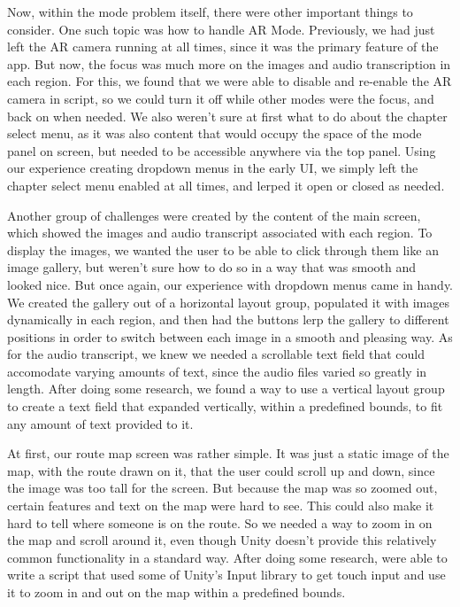 \documentclass[a4paper, 10pt, american, titlepage]{article}
\begin{document}
Now, within the mode problem itself, there were other important things to 
consider. One such topic was how to handle AR Mode. Previously, we had just
left the AR camera running at all times, since it was the primary feature of 
the app. But now, the focus was much more on the images and audio transcription
in each region. For this, we found that we were able to disable and re-enable
the AR camera in script, so we could turn it off while other modes were the
focus, and back on when needed. We also weren't sure at first what to do about
the chapter select menu, as it was also content that would occupy the space of
the mode panel on screen, but needed to be accessible anywhere via the top 
panel. Using our experience creating dropdown menus in the early UI, we simply
left the chapter select menu enabled at all times, and lerped it open or closed
as needed. 

Another group of challenges were created by the content of the main screen,
which showed the images and audio transcript associated with each region. To 
display the images, we wanted the user to be able to click through them like
an image gallery, but weren't sure how to do so in a way that was smooth and
looked nice. But once again, our experience with dropdown menus came in handy. 
We created the gallery out of a horizontal layout group, populated it with 
images dynamically in each region, and then had the buttons lerp the gallery
to different positions in order to switch between each image in a smooth and 
pleasing way. As for the audio transcript, we knew we needed a scrollable
text field that could accomodate varying amounts of text, since the audio files
varied so greatly in length. After doing some research, we found a way to use 
a vertical layout group to create a text field that expanded vertically, within
a predefined bounds, to fit any amount of text provided to it. 

At first, our route map screen was rather simple. It was just a static image
of the map, with the route drawn on it, that the user could scroll up and down,
since the image was too tall for the screen. But because the map was so zoomed
out, certain features and text on the map were hard to see. This could also 
make it hard to tell where someone is on the route. So we needed a way to zoom
in on the map and scroll around it, even though Unity doesn't provide this 
relatively common functionality in a standard way. After doing some research, 
were able to write a script that used some of Unity's Input library to get
touch input and use it to zoom in and out on the map within a predefined 
bounds. 
\end{document}
